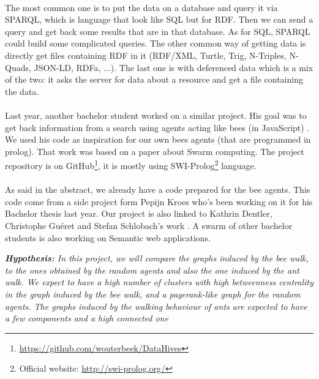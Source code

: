 \documentclass{article}
\begin{document}
	\paragraph{} %
		The most common one is to put the data on a database and query it via SPARQL,
		which is language that look like SQL but for RDF.
		Then we can send a query and get back some results that are in that database.
		As for SQL, SPARQL could build some complicated queries.
		The other common way of getting data is directly get files containing RDF in it
		(RDF/XML, Turtle, Trig, N-Triples, N-Quads, JSON-LD, RDFa, ...).
		The last one is with deferenced data which is a mix of the two:
		it asks the server for data about a resource and get a file containing the data.
	\paragraph{} %
		Last year, another bachelor student worked on a similar project.
		His goal was to get back information from a search using agents acting like bees (in JavaScript) \cite{Kroes13,Kroes13-2}.
		We used his code as inspiration for our own bees agents (that are programmed in prolog).
		That work was based on a paper \cite{Gueret10} about Swarm computing.
		The project repository is on GitHub\footnote{ \url{https://github.com/wouterbeek/DataHives}},
		it is mostly using SWI-Prolog\footnote{ Official website: \url{http://swi-prolog.org/}} language.
	\paragraph{} %
		As said in the abstract, we already have a code prepared for the bee agents.
		This code come from a side project form Pepijn Kroes who's been working on it for his Bachelor thesis last year.
		Our project is also linked to Kathrin Dentler, Christophe Gu\'eret and Stefan Schlobach's work \cite{Gueret10}.
		A swarm of other bachelor students is also working on Semantic web applications.
	\begin{center}
		\textit{
		\textbf{Hypothesis:} In this project, we will compare the graphs induced by the bee walk,
		to the ones obtained by the random agents and also the one induced by the ant walk.
		We expect to have a high number of clusters with high betweenness centrality in the graph induced by the bee walk,
		and a pagerank-like graph for the random agents.
		The graphs induced by the walking behaviour of ants are expected to have a few components and a high connected one}
	\end{center}
\end{document}
